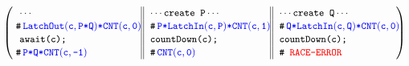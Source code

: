 
\begin{center}
  \begin{small}
 \\
 \\
\\\vspace{-12pt}
\[
\left(
\begin{tabular}{ 
  l@{\extracolsep{\fill}} || 
  l@{\extracolsep{\fill}} || 
  l@{\extracolsep{\fill}} }
\code{\dotonly{}} & \code{\dotsaying{create P}} & \code{\dotsaying{create Q}} \\
\!\!\code{\CSPEC{\!\!\LatchOut{c}{P{\sep}Q}{\sep}\CNT{c}{0}}}
&\code{\CSPEC{\!\!P{\sep}\LatchIn{c}{P}{\sep}\CNT{c}{1}}} 
& \code{\CSPEC{\!\!Q{\sep}\LatchIn{c}{Q}{\sep}\CNT{c}{0}}} \\
\code{await(c);} & \code{countDown(c);} & \code{countDown(c);}\\
\!\!\code{\CSPEC{\!\!{P{\sep}Q{\sep}\CNT{c}{-1}}}}
& \code{\CSPEC{\!\!\CNT{c}{0}}} 
& \code{\CSPEC{\color{red} RACE-ERROR}} \\
\end{tabular}\!\!\right)%
\]

\end{small}
\end{center}
